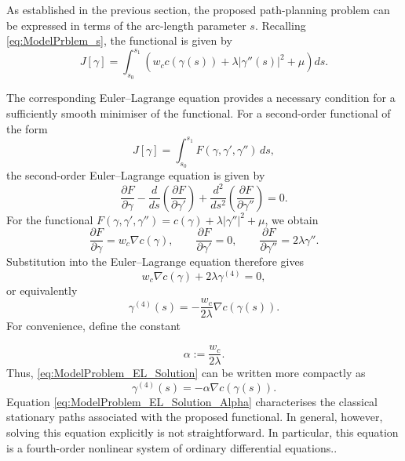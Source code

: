 As established in the previous section, the proposed path-planning problem can be expressed in terms of the arc-length parameter $s$. Recalling \eqref{eq:ModelPrblem_s}, the functional is given by
\begin{equation}
J[\gamma]
=
\int_{s_0}^{s_1}
\left(
w_c c(\gamma(s))
+
\lambda |\gamma''(s)|^2
+
\mu
\right) ds.
\end{equation}

The corresponding Euler--Lagrange equation provides a necessary condition for a sufficiently smooth minimiser of the functional. For a second-order functional of the form
$$
J[\gamma]
=
\int_{s_0}^{s_1}
F(\gamma,\gamma',\gamma'')\,ds,
$$
the second-order Euler--Lagrange equation is given by
\begin{equation}
\frac{\partial F}{\partial\gamma}
-
\frac{d}{ds}
\left(
\frac{\partial F}{\partial\gamma'}
\right)
+
\frac{d^2}{ds^2}
\left(
\frac{\partial F}{\partial\gamma''}
\right)
=0.
\end{equation}
For the functional $F(\gamma,\gamma',\gamma'')= c(\gamma)
+\lambda|\gamma''|^2
+\mu$, we obtain
$$
\frac{\partial F}{\partial\gamma}
=
w_c\nabla c(\gamma),
\qquad
\frac{\partial F}{\partial\gamma'}
=
0,
\qquad
\frac{\partial F}{\partial\gamma''}
=
2\lambda\gamma''.
$$
Substitution into the Euler--Lagrange equation therefore gives
$$
w_c\nabla c(\gamma)
+
2\lambda\gamma^{(4)}
=
0,
$$
or equivalently
\begin{equation}
\label{eq:ModelProblem_EL_Solution}
\gamma^{(4)}(s)
=
-\frac{w_c}{2\lambda}
\nabla c(\gamma(s)).
\end{equation}
For convenience, define the constant

$$
\alpha := \frac{w_c}{2\lambda}.
$$
Thus, \eqref{eq:ModelProblem_EL_Solution} can be written more compactly as
\begin{equation}
\label{eq:ModelProblem_EL_Solution_Alpha}
\gamma^{(4)}(s)
=
-\alpha\nabla c(\gamma(s)).
\end{equation}
Equation \eqref{eq:ModelProblem_EL_Solution_Alpha} characterises the classical stationary paths associated with the proposed functional. In general, however, solving this equation explicitly is not straightforward. In particular, this equation is a fourth-order nonlinear system of ordinary differential equations..



